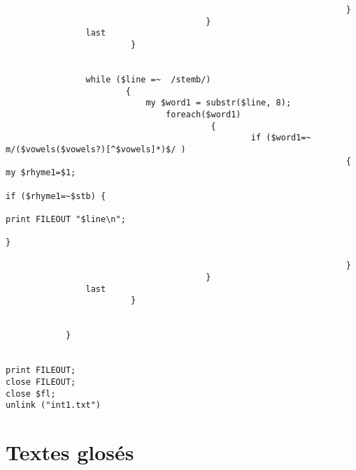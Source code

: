 \documentclass[11pt, a4paper]{book}              %
\begin{document}
\begin{lstlisting}
                                                                    }
                                        }
                last
                         }
                        
                        
                while ($line =~  /stemb/)
                        {
                            my $word1 = substr($line, 8);
                                foreach($word1)
                                         {  
                                                 if ($word1=~ m/($vowels($vowels?)[^$vowels]*)$/ )
                                                                    { my $rhyme1=$1;
                                                                           if ($rhyme1=~$stb) {
                                                                            print FILEOUT "$line\n";
                                                                           }
                                                                 
                                                                    }
                                        }
                last
                         }
                        
                        
            }


print FILEOUT;
close FILEOUT;
close $fl;
unlink ("int1.txt")

\end{lstlisting}



\chapter*{Textes glosés} 
 
\end{document}
